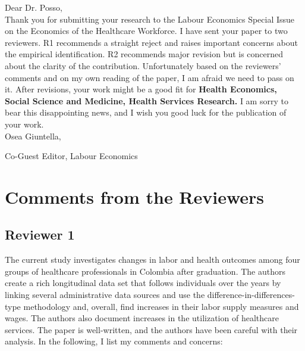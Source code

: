 \documentclass[12pt]{article}
\begin{document}
Dear Dr. Posso, \\

Thank you for submitting your research to the Labour Economics Special Issue on the Economics of the Healthcare Workforce. I have sent your paper to two reviewers. R1 recommends a straight reject and raises important concerns about the empirical identification. R2 recommends major revision but is concerned about the clarity of the contribution. Unfortunately based on the reviewers' comments and on my own reading of the paper, I am afraid we need to pass on it. After revisions, your work might be a good fit for \textbf{Health Economics, Social Science and Medicine, Health Services Research.} I am sorry to bear this disappointing news, and I wish you good luck for the publication of your work. \\

Osea Giuntella, 

Co-Guest Editor, Labour Economics



\section{Comments from the Reviewers}

\subsection{Reviewer 1}

The current study investigates changes in labor and health outcomes among four groups of healthcare professionals in Colombia after graduation. The authors create a rich longitudinal data set that follows individuals over the years by linking several administrative data sources and use the difference-in-differences-type methodology and, overall, find increases in their labor supply measures and wages. The authors also document increases in the utilization of healthcare services. The paper is well-written, and the authors have been careful with their analysis. In the following, I list my comments and concerns:
\end{document}
